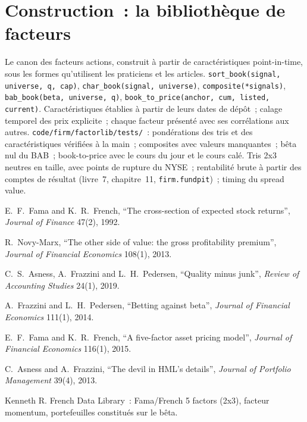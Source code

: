 \section{Construction~: la bibliothèque de facteurs}\label{bld:s1:value-quality-and-low-risk:factorlib}

\begin{build}
 Le canon des facteurs actions, construit à partir de caractéristiques point-in-time, sous les formes qu'utilisent les praticiens et les articles.
 \texttt{sort\_book(signal, universe, q, cap)}, \texttt{char\_book(signal, universe)}, \texttt{composite(*signals)},
\texttt{bab\_book(beta, universe, q)}, \texttt{book\_to\_price(anchor, cum, listed, current)}.
 Caractéristiques établies à partir de leurs dates de dépôt~; calage temporel des prix explicite~; chaque facteur présenté avec ses corrélations aux autres.
 \texttt{code/firm/factorlib/tests/}~: pondérations des tris et des caractéristiques vérifiées à la main~; composites avec valeurs manquantes~; bêta nul du BAB~;
book-to-price avec le cours du jour et le cours calé.
 Tris 2x3 neutres en taille, avec points de rupture du NYSE~; rentabilité brute à partir des comptes de résultat (livre~7, chapitre~11, \texttt{firm.fundpit})~;
timing du spread value.
\end{build}

\begin{omsources}
\item E.~F.~Fama and K.~R.~French, ``The cross-section of expected stock returns'', \emph{Journal of Finance} 47(2), 1992.
\item R.~Novy-Marx, ``The other side of value: the gross profitability premium'', \emph{Journal of Financial Economics} 108(1), 2013.
\item C.~S.~Asness, A.~Frazzini and L.~H.~Pedersen, ``Quality minus junk'', \emph{Review of Accounting Studies} 24(1), 2019.
\item A.~Frazzini and L.~H.~Pedersen, ``Betting against beta'', \emph{Journal of Financial Economics} 111(1), 2014.
\item E.~F.~Fama and K.~R.~French, ``A five-factor asset pricing model'', \emph{Journal of Financial Economics} 116(1), 2015.
\item C.~Asness and A.~Frazzini, ``The devil in HML's details'', \emph{Journal of Portfolio Management} 39(4), 2013.
\item Kenneth R. French Data Library~: Fama/French 5 factors (2x3), facteur momentum, portefeuilles constitués sur le bêta.
\end{omsources}

